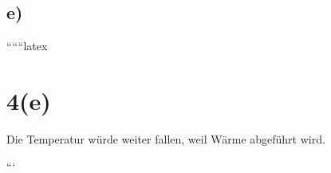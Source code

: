 

\subsection*{e)}

``````latex

\section*{4(e)}
Die Temperatur würde weiter fallen, weil Wärme abgeführt wird.

```